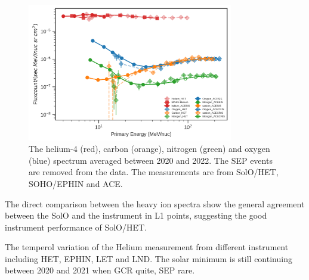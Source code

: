 \begin{figure}
    \centering
    \includegraphics[width = 0.8\textwidth]{images/ACR/Overviewspectra_twoyear_wto_SEP.png}
    \caption{The helium-4 (red), carbon (orange), nitrogen (green) and oxygen (blue) spectrum averaged between 2020 and 2022. The \ac{SEP} events are removed from the data. The measurements are from \ac{SolO}/\ac{HET}, \ac{SOHO}/\ac{EPHIN} and \ac{ACE}. }
    \label{fig:overview}
\end{figure}

The direct comparison between the heavy ion spectra show the general agreement between the \ac{SolO} and the instrument in L1 points, suggesting the good instrument performance of \ac{SolO}/\ac{HET}.


The temperol variation of the Helium measurement from different instrument including HET, EPHIN, LET and LND.
The solar minimum is still continuing between 2020 and 2021 when GCR quite, SEP rare.

